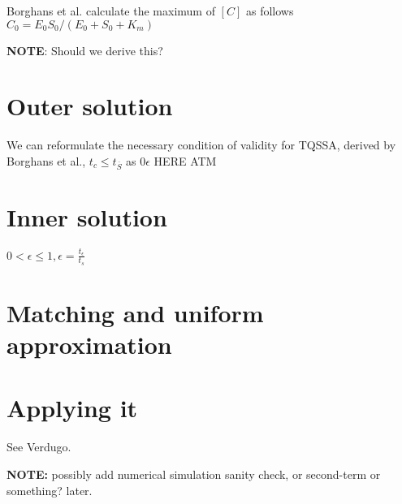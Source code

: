 \documentclass[12pt]{report}
\begin{document}
Borghans et al. calculate the maximum of $[C]$ as follows $C_0 = E_0S_0 / (E_0 + S_0 + K_m)$

\textbf{NOTE}: Should we derive this?

\section{Outer solution}

We can reformulate the necessary condition of validity for TQSSA, derived by Borghans et al., $t_c \leq t_{\overline{S}}$ as $0\epsilon$ HERE ATM

\section{Inner solution}

$0 < \epsilon \leq 1, \epsilon = \frac{t_{\epsilon}}{t_{s}}$

\section{Matching and uniform approximation}

\section{Applying it}

See Verdugo.

\textbf{NOTE:} possibly add numerical simulation sanity check, or second-term or
something? later.


\end{document}
